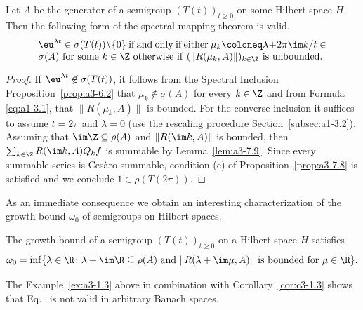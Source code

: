 \begin{theorem}\label{thm:a3-7.10}
%
Let $A$ be the generator of a semigroup $(T(t))_{t\geq 0}$ on some Hilbert space $H$.
Then the following form of the spectral mapping theorem is valid.
\[
\begin{minipage}{.85\textwidth}
	$ \eu^{\lambda t} \in \sigma(T(t))\setminus\{0\} $ if and only if either 
	$\mu_{k}\coloneq \lambda + 2\pi\im  k/t \in \sigma(A)$ for some  $k \in \Z$
	otherwise  if\/ $(\|R(\mu_{k},A)\|)_{k\in\Z}$ is unbounded.
\end{minipage}
\]
\end{theorem}
\begin{proof}
If\/ $\eu^{\lambda t} \not\in \sigma(T(t))$, it follows from the Spectral Inclusion Proposition~\ref{prop:a3-6.2} that $\mu_{k} \not\in \sigma(A)$ for every $k \in \Z$ and from Formula \eqref{eq:a1-3.1},  that $\|R(\mu_{k},A)\|$ is bounded.
For the converse inclusion it suffices to assume $t = 2\pi$ and $\lambda = 0$ (use the rescaling procedure Section~\ref{subsec:a1-3.2}).
Assuming that $\im\Z \subseteq \rho(A)$ and $\|R(\im k,A)\|$ is bounded, then $\sum_{k\in\Z} R(\im k,A)Q_{k}f$ is summable by Lemma~\ref{lem:a3-7.9}.
Since every summable series is Cesàro-summable, condition (c) of Proposition~\ref{prop:a3-7.8} is satisfied and we conclude $1 \in \rho(T(2\pi))$.
\end{proof}
As an immediate consequence we obtain an interesting characterization of the growth bound $\omega_{0}$ of semigroups on Hilbert spaces.
\begin{corollary}\label{cor:a3-7.11}
%
The growth bound 
of a semigroup $(T(t))_{t\geq 0}$ on a Hilbert space $H$ satisfies
\begin{equation}\label{eq:a3-7.9}
\omega_{0} = \inf \{\lambda \in \R \colon \lambda + \im\R \subseteq \rho(A) \text{ and } \|R(\lambda+\im\mu,A)\| \text{ is bounded for } \mu \in \R\} .
\end{equation}
\end{corollary}
The Example~\ref{ex:a3-1.3} above in combination with Corollary~\ref{cor:c3-1.3} shows that Eq.~ is not valid in arbitrary Banach spaces.
